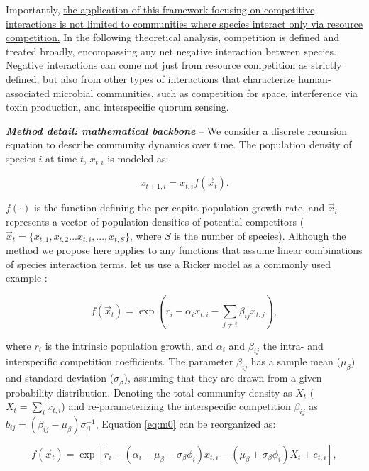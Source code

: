 \documentclass[12pt, class=article, crop=false]{standalone}
\begin{document}
Importantly, \ul{the application of this framework focusing on competitive interactions is not limited to communities where species interact only via resource competition.}
In the following theoretical analysis, competition is defined and treated broadly, encompassing any net negative interaction between species.
Negative interactions can come not just from resource competition as strictly defined, but also from other types of interactions that characterize human-associated microbial communities, such as competition for space, interference via toxin production, and interspecific quorum sensing.

\textbf{\textit{Method detail: mathematical backbone}} -- 
We consider a discrete recursion equation to describe community dynamics over time. The population density of species $i$ at time $t$, $x_{t,i}$ is modeled as:

\begin{equation}
\label{eq:m0}
x_{t + 1, i} = x_{t, i} f(\overset{\rightarrow}{x}_{t}).
\end{equation}

$f(\cdot)$ is the function defining the per-capita population growth rate, and $\overset{\rightarrow}{x}_{t}$ represents a vector of population densities of potential competitors ($\overset{\rightarrow}{x}_{t} = \{x_{t,1}, x_{t,2}...x_{t,i},...,x_{t,S}\}$, where $S$ is the number of species).
Although the method we propose here applies to any functions that assume linear combinations of species interaction terms, let us use a Ricker model as a commonly used example \citep{ricker_stock_1954, fowler_species_2012, terui_intentional_2023}:

\begin{equation}
\label{eq:ricker}
f(\overset{\rightarrow}{x}_{t}) = \exp(r_i - \alpha_i x_{t,i} - \sum_{j \ne i} \beta_{ij} x_{t,j}),
\end{equation}

where $r_i$ is the intrinsic population growth, and $\alpha_{i}$ and $\beta_{ij}$ the intra- and interspecific competition coefficients.
The parameter $\beta_{ij}$ has a sample mean ($\mu_{\beta}$) and standard deviation ($\sigma_{\beta}$), assuming that they are drawn from a given probability distribution. 
Denoting the total community density as $X_t$ ($X_t = \sum_i x_{t,i}$) and re-parameterizing the interspecific competition $\beta_{ij}$ as $b_{ij} = (\beta_{ij} - \mu_{\beta}) \sigma_{\beta}^{-1}$, Equation \ref{eq:m0} can be reorganized as:

\begin{equation}
\label{eq:rickermod0}
f(\overset{\rightarrow}{x}_{t}) = \exp\left[r_i - (\alpha_i - \mu_{\beta} - \sigma_{\beta} \phi_i) x_{t,i} - (\mu_{\beta} +  \sigma_{\beta} \phi_i) X_t + e_{t,i} \right],
\end{equation}
\end{document}
